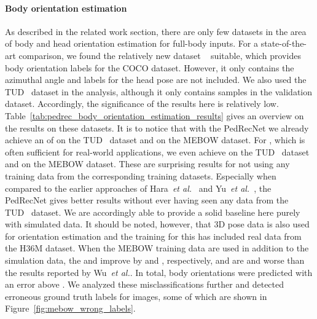 \documentclass[a4paper, 10pt, conference]{ieeeconf}
\begin{document}
\paragraph{Body orientation estimation}
\label{sec:pedrec:results:orientation}
As described in the related work section, there are only few datasets in the area of body and head orientation estimation for full-body inputs. For a state-of-the-art comparison, we found the relatively new dataset ~\cite{wuMEBOWMonocularEstimation2020} suitable, which provides body orientation labels for the COCO dataset. However, it only contains the azimuthal angle  and labels for the head pose are not included. We also used the TUD~\cite{andrilukaMonocular3DPose2010} dataset in the analysis, although it only contains  samples in the validation dataset. Accordingly, the significance of the results here is relatively low. Table~\ref{tab:pedrec_body_orientation_estimation_results} gives an overview on the results on these datasets. It is to notice that with the PedRecNet we already achieve an  of  on the TUD~\cite{andrilukaMonocular3DPose2010} dataset and  on the MEBOW dataset. For , which is often sufficient for real-world applications, we even achieve  on the TUD~\cite{andrilukaMonocular3DPose2010} dataset and  on the MEBOW dataset. These are surprising results for not using any training data from the corresponding training datasets. Especially when compared to the earlier approaches of Hara~\textit{et al.}~\cite{haraDesigningDeepConvolutional2017} and Yu~\textit{et al.}~\cite{yuContinuousPedestrianOrientation2019}, the PedRecNet gives better results without ever having seen any data from the TUD~\cite{andrilukaMonocular3DPose2010} dataset. We are accordingly able to provide a solid baseline here purely with simulated data. It should be noted, however, that 3D pose data is also used for orientation estimation and the training for this has included real data from the H36M dataset. When the MEBOW training data are used in addition to the simulation data, the  and  improve by  and , respectively, and are  and  worse than the results reported by Wu~\textit{et al.}. In total,  body orientations were predicted with an error above . We analyzed these misclassifications further and detected erroneous ground truth labels for  images, some of which are shown in Figure~\ref{fig:mebow_wrong_labels}. 
\end{document}
